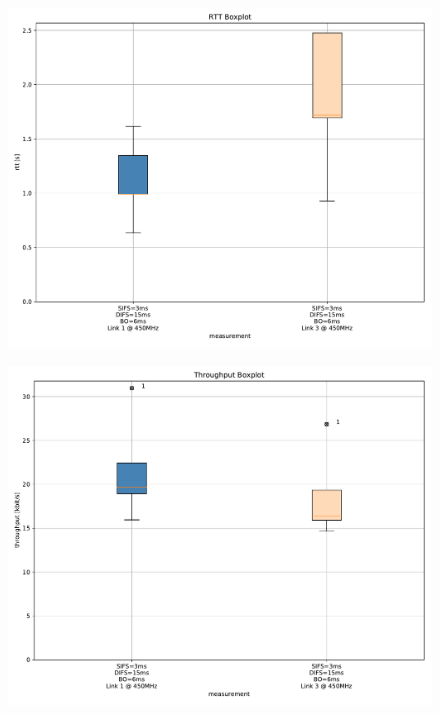 \documentclass{article}
\begin{document}
\begin{figure}
	\includegraphics[width=\textwidth]{rb_dual/link_1_3/boxplot/rtt_boxplot}
\end{figure}

\begin{figure}
	\includegraphics[width=\textwidth]{rb_dual/link_1_3/boxplot/throughput_boxplot}
\end{figure}
\end{document}

